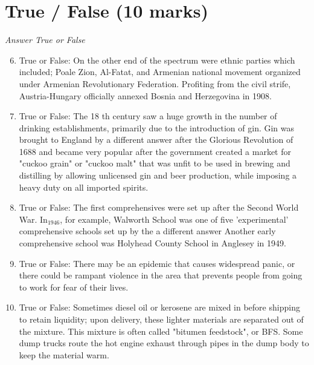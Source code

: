 \documentclass[12pt]{article}
\begin{document}
\section*{True / False (10 marks)}
\textit{Answer True or False}
\begin{enumerate}[label=\arabic*.]
\setcounter{enumi}{5}
\item True or False: On the other end of the spectrum were ethnic parties which included; Poale Zion, Al-Fatat, and Armenian national movement organized under Armenian Revolutionary Federation. Profiting from the civil strife, Austria-Hungary officially annexed Bosnia and Herzegovina in 1908.
\item True or False: The 18 th century saw a huge growth in the number of drinking establishments, primarily due to the introduction of gin. Gin was brought to England by a different answer after the Glorious Revolution of 1688 and became very popular after the government created a market for "cuckoo grain" or "cuckoo malt" that was unfit to be used in brewing and distilling by allowing unlicensed gin and beer production, while imposing a heavy duty on all imported spirits.
\item True or False: The first comprehensives were set up after the Second World War. In$_{1946}$, for example, Walworth School was one of five 'experimental' comprehensive schools set up by the a different answer Another early comprehensive school was Holyhead County School in Anglesey in 1949.
\item True or False: There may be an epidemic that causes widespread panic, or there could be rampant violence in the area that prevents people from going to work for fear of their lives.
\item True or False: Sometimes diesel oil or kerosene are mixed in before shipping to retain liquidity; upon delivery, these lighter materials are separated out of the mixture. This mixture is often called "bitumen feedstock", or BFS. Some dump trucks route the hot engine exhaust through pipes in the dump body to keep the material warm.
\end{enumerate}
\end{document}
